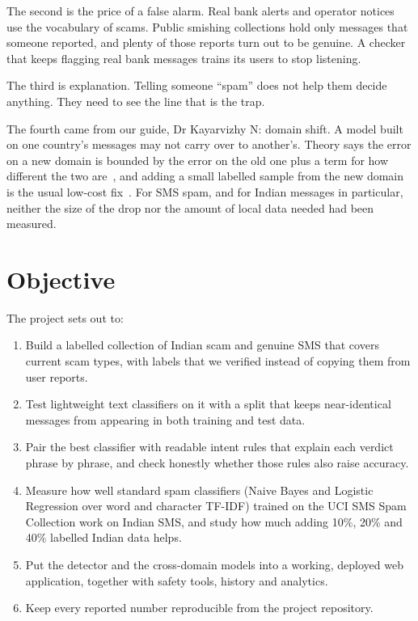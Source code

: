 The second is the price of a false alarm. Real bank alerts and operator notices use the vocabulary of scams. Public smishing collections hold only messages that someone reported, and plenty of those reports turn out to be genuine. A checker that keeps flagging real bank messages trains its users to stop listening.

The third is explanation. Telling someone ``spam'' does not help them decide anything. They need to see the line that is the trap.

The fourth came from our guide, Dr Kayarvizhy N: domain shift. A model built on one country's messages may not carry over to another's. Theory says the error on a new domain is bounded by the error on the old one plus a term for how different the two are~\cite{bendavid2010theory}, and adding a small labelled sample from the new domain is the usual low-cost fix~\cite{pan2010survey,daume2007frustratingly}. For SMS spam, and for Indian messages in particular, neither the size of the drop nor the amount of local data needed had been measured.

\section{Objective}
The project sets out to:
\begin{enumerate}
\item Build a labelled collection of Indian scam and genuine SMS that covers current scam types, with labels that we verified instead of copying them from user reports.
\item Test lightweight text classifiers on it with a split that keeps near-identical messages from appearing in both training and test data.
\item Pair the best classifier with readable intent rules that explain each verdict phrase by phrase, and check honestly whether those rules also raise accuracy.
\item Measure how well standard spam classifiers (Naive Bayes and Logistic Regression over word and character TF-IDF) trained on the UCI SMS Spam Collection work on Indian SMS, and study how much adding 10\%, 20\% and 40\% labelled Indian data helps.
\item Put the detector and the cross-domain models into a working, deployed web application, together with safety tools, history and analytics.
\item Keep every reported number reproducible from the project repository.
\end{enumerate}

